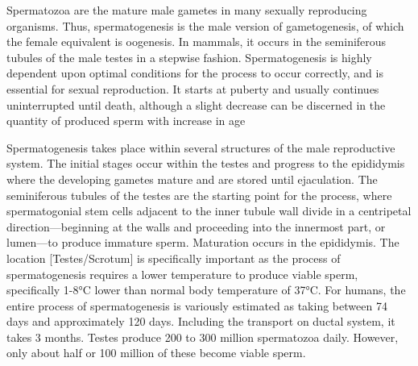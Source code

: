 \documentclass[]{book}
\theoremstyle{definition}
\theoremstyle{definition}
\theoremstyle{definition}
\theoremstyle{remark}
\begin{document}
Spermatozoa are the mature male gametes in many sexually reproducing
organisms. Thus, spermatogenesis is the male version of gametogenesis,
of which the female equivalent is oogenesis. In mammals, it occurs in
the seminiferous tubules of the male testes in a stepwise fashion.
Spermatogenesis is highly dependent upon optimal conditions for the
process to occur correctly, and is essential for sexual reproduction. It
starts at puberty and usually continues uninterrupted until death,
although a slight decrease can be discerned in the quantity of produced
sperm with increase in age

Spermatogenesis takes place within several structures of the male
reproductive system. The initial stages occur within the testes and
progress to the epididymis where the developing gametes mature and are
stored until ejaculation. The seminiferous tubules of the testes are the
starting point for the process, where spermatogonial stem cells adjacent
to the inner tubule wall divide in a centripetal direction---beginning
at the walls and proceeding into the innermost part, or lumen---to
produce immature sperm. Maturation occurs in the epididymis. The
location {[}Testes/Scrotum{]} is specifically important as the process
of spermatogenesis requires a lower temperature to produce viable sperm,
specifically 1-8°C lower than normal body temperature of 37°C. For
humans, the entire process of spermatogenesis is variously estimated as
taking between 74 days and approximately 120 days. Including the
transport on ductal system, it takes 3 months. Testes produce 200 to 300
million spermatozoa daily. However, only about half or 100 million of
these become viable sperm.
\end{document}

